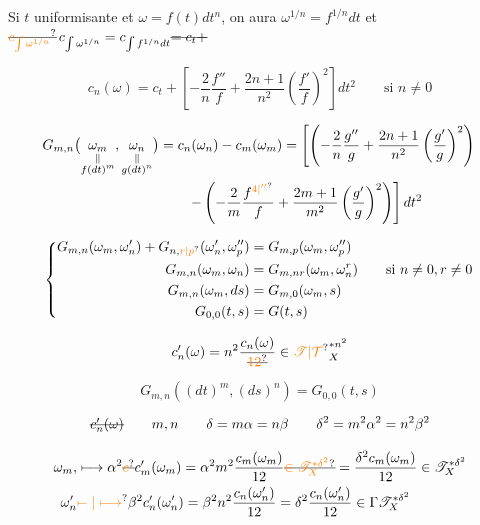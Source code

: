 Si $t$ uniformisante et $\omega=f(t)dt^n$, on aura $\omega^{1/n}=f^{1/n}dt$ et $\deleted{\unsure{c_{\int\omega^{1/n}}}}\,c_{\int\omega^{1/n}}=c_{\int f^{1/n}dt}\deleted{=c_t+}$

\[ c_n(\omega)=c_t+\left[-\frac2n\frac{f''}{f}+\frac{2n+1}{n^2}\left(\frac{f'}f\right)^2\right]dt^2 \qquad\text{si }n\ne0 \]


\[ \begin{aligned}
 G_{m,n}\bigl(\underset{\substack{\Vert\\ f(dt)^m}}{\omega_m},\underset{\substack{\Vert\\g(dt)^{n}}}{\omega_n}\bigr)
 &=c_n(\omega_n)-c_m(\omega_m)=\left[\left(-\frac2n\frac{g''}g+\frac{2n+1}{n^2}\left(\frac{g'}g\right)^2\right)\right.\\
 &\qquad\left.-\left(-\frac2m\frac{f^{\unsure{4|''}}}{f}+\frac{2m+1}{m^2}\left(\frac{g'}g\right)^2\right)\right]dt^2
 \end{aligned} \]

\[ \left\{\begin{aligned}
 G_{m,n}(\omega_m,\omega'_n)+G_{n,\unsure{r|p}}(\omega'_n,\omega''_p)&=G_{m,p}(\omega_m,\omega''_p)\\
 G_{m,n}(\omega_m,\omega_n)&=G_{m,nr}(\omega_m,\omega_n^r)\qquad\text{si }n\ne0,r\ne0\\
 G_{m,n}(\omega_m,ds)&=G_{m,0}(\omega_m,s)\\
 G_{0,0}(t,s)&=G(t,s)
 \end{aligned}\right. \]


\[ c'_n(\omega)=n^2\frac{c_n(\omega)}{\deleted{\unsure{12}}}\in \unsure{\mathscr T|\mathcal T}_X^{* n^2} \]

\[ G_{m,n}((dt)^m,(ds)^n)=G_{0,0}(t,s) \]

\[ \deleted{c'_n(\omega)}\qquad m,n\qquad\delta=m\alpha=n\beta\qquad\delta^2=m^2\alpha^2=n^2\beta^2 \]

\[ \begin{aligned}
 \omega_m,&\longmapsto\alpha^2\deleted{\unsure{c}}c'_m(\omega_m)=\alpha^2m^2\frac{c_m(\omega_m)}{12}\deleted{\unsure{\in\mathscr T_X^{*\delta^2}}}=\frac{\delta^2c_m(\omega_m)}{12}\in\mathscr T_X^{*\delta^2}\\
 \omega'_n&\unsure{\mapstochar\relbar|\longmapsto}\beta^2c'_n(\omega'_n)=\beta^2n^2\frac{c_n(\omega'_n)}{12}=\delta^2\frac{c_n(\omega'_n)}{12}\in\Gamma\mathscr T_X^{*\delta^2}
 \end{aligned} \]

